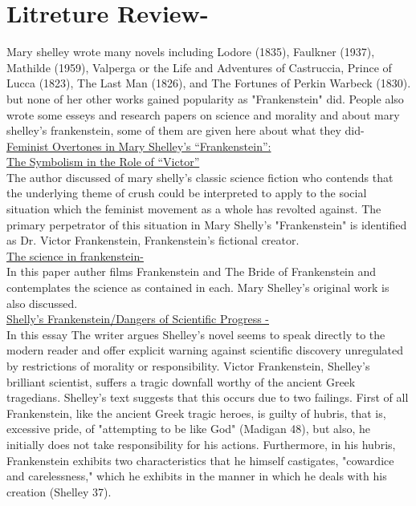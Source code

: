 \documentclass[12pt]{report}
\begin{document}
\section{Litreture Review-}
\LARGE
Mary shelley wrote many novels including Lodore (1835), Faulkner (1937), Mathilde (1959), Valperga or the Life and Adventures of Castruccia, Prince of Lucca (1823), The Last Man (1826), and The Fortunes of Perkin Warbeck (1830). but none of her other works gained popularity as "Frankenstein" did. 
People also wrote some esseys and research papers on science and morality and about mary shelley's frankenstein, some of them are given here about what they did-
\\
\underline{Feminist Overtones in Mary Shelley's “Frankenstein”:}\\
\underline{The Symbolism in the Role of “Victor”} 
\\
	The author discussed of mary shelly's classic science fiction who contends that the underlying theme of crush could be interpreted to apply to the social situation which the feminist movement as a whole has revolted against. The primary perpetrator of this situation in Mary Shelly’s "Frankenstein" is identified as Dr. Victor Frankenstein, Frankenstein’s fictional creator.\\
	
\underline{The science in frankenstein-}
\\ 
In this paper auther films Frankenstein and The Bride of Frankenstein and contemplates the science as contained in each. Mary Shelley's original work is also discussed.\\

\underline{Shelly's Frankenstein/Dangers of Scientific Progress -}
\\
In this essay The writer argues Shelley's novel seems to speak directly to the modern reader and offer explicit warning against scientific discovery unregulated by restrictions of morality or responsibility. Victor Frankenstein, Shelley's brilliant scientist, suffers a tragic downfall worthy of the ancient Greek tragedians. Shelley's text suggests that this occurs due to two failings. First of all Frankenstein, like the ancient Greek tragic heroes, is guilty of hubris, that is, excessive pride, of "attempting to be like God" (Madigan 48), but also, he initially does not take responsibility for his actions. Furthermore, in his hubris, Frankenstein exhibits two characteristics that he himself castigates, "cowardice and carelessness," which he exhibits in the manner in which he deals with his creation (Shelley 37).\\
\end{document}
